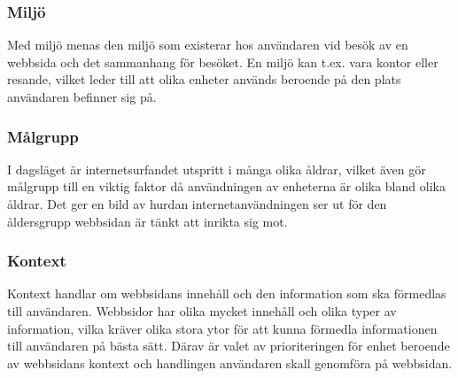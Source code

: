 \documentclass[11pt]{article}
\begin{document}
\subsubsection{Miljö}
Med miljö menas den miljö som existerar hos användaren vid besök av en webbsida och det sammanhang för besöket. En miljö kan t.ex. vara kontor eller resande, vilket leder till att olika enheter används beroende på den plats användaren befinner sig på.

\subsubsection{Målgrupp}
I dagsläget är internetsurfandet utspritt i många olika åldrar, vilket även gör målgrupp till en viktig faktor då användningen av enheterna är olika bland olika åldrar. Det ger en bild av hurdan internetanvändningen ser ut för den åldersgrupp webbsidan är tänkt att inrikta sig mot.

\subsubsection{Kontext}
Kontext handlar om webbsidans innehåll och den information som ska förmedlas till användaren. Webbsidor har olika mycket innehåll och olika typer av information, vilka kräver olika stora ytor för att kunna förmedla informationen till användaren på bästa sätt.  Därav är valet av prioriteringen för enhet beroende av webbsidans kontext och handlingen användaren skall genomföra på webbsidan.
\end{document}
